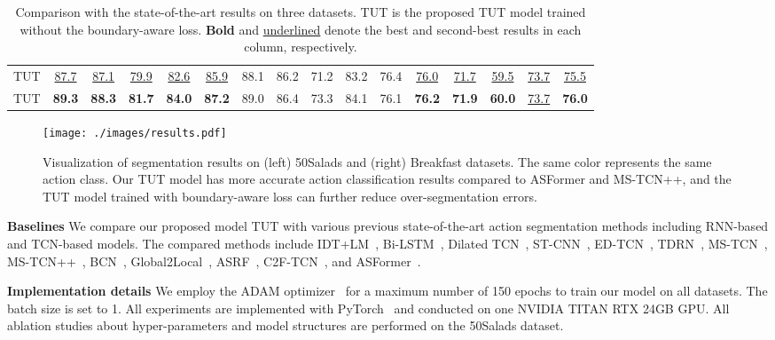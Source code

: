 \documentclass[letterpaper]{article} \usepackage[submission]{aaai23}  \usepackage{times}  \usepackage{helvet}  \usepackage{courier}  \usepackage[hyphens]{url}  \usepackage{graphicx} \urlstyle{rm} \def\UrlFont{\rm}  \usepackage{natbib}  \usepackage{caption} \frenchspacing  \setlength{\pdfpagewidth}{8.5in} \setlength{\pdfpageheight}{11in} \usepackage{algorithm}
\begin{document}
\begin{table*}[t]
\begin{tabular}{l|ccccc|ccccc|ccccc}
\midrule
TUT  & \underline{87.7} & \underline{87.1} & \underline{79.9} & \underline{82.6} & \underline{85.9} & 88.1 & 86.2 & 71.2 & 83.2 &  76.4 &  \underline{76.0} & \underline{71.7} & \underline{59.5} & \underline{73.7} & \underline{75.5}\\
TUT & \textbf{89.3} & \textbf{88.3} & \textbf{81.7} & \textbf{84.0} & \textbf{87.2} & 89.0 & 86.4 & 73.3 & 84.1 & 76.1 & \textbf{76.2} & \textbf{71.9} & \textbf{60.0} & \underline{73.7} & \textbf{76.0}\\
\bottomrule
\end{tabular}
\caption{Comparison with the state-of-the-art results on three datasets. TUT is the proposed TUT model trained without the boundary-aware loss. \textbf{Bold} and \underline{underlined} denote the best and second-best results in each column, respectively.}
\label{tab:sota}
\end{table*}

\begin{figure*}[t]
\centering
\texttt{[image: ./images/results.pdf]} \caption{Visualization of segmentation results on (left) 50Salads and (right) Breakfast datasets. The same color represents the same action class. Our TUT model has more accurate action classification results compared to ASFormer and MS-TCN++, and the TUT model trained with boundary-aware loss can further reduce over-segmentation errors.}
\label{fig:result}
\end{figure*}

\textbf{Baselines}\quad
We compare our proposed model TUT with various previous state-of-the-art action segmentation methods including RNN-based and TCN-based models. The compared methods include IDT+LM~\cite{richard2016temporal}, Bi-LSTM~\cite{singh2016multi}, Dilated TCN~\cite{lea2017temporal}, ST-CNN~\cite{lea2016segmental}, ED-TCN~\cite{lea2017temporal}, TDRN~\cite{lei2018temporal}, MS-TCN~\cite{farha2019ms}, MS-TCN++~\cite{li2020ms}, BCN~\cite{BCN}, Global2Local~\cite{gao2021global2local}, ASRF~\cite{asrf}, C2F-TCN~\cite{singhania2021coarse}, and ASFormer~\cite{ASFormer}. 

\textbf{Implementation details}\quad
We employ the ADAM optimizer~\cite{adam}  for a maximum number of 150 epochs to train our model on all datasets. The batch size is set to 1. All experiments are implemented with PyTorch~\cite{pytorch} and conducted on one NVIDIA TITAN RTX 24GB GPU. All ablation studies about hyper-parameters and model structures are performed on the 50Salads dataset.
\end{document}
